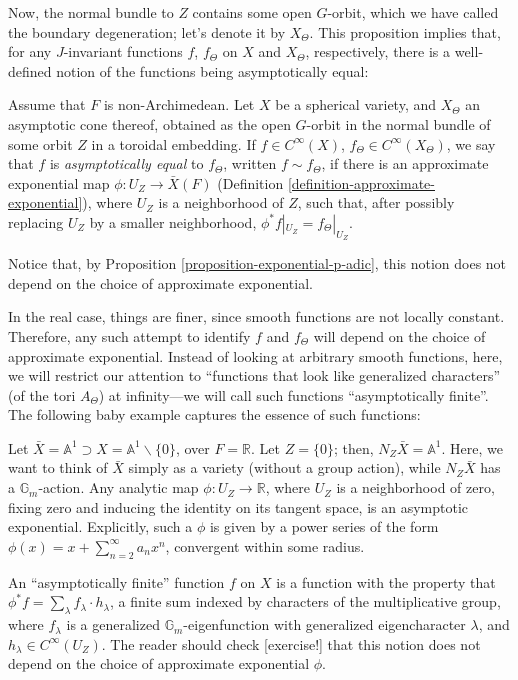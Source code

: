 Now, the normal bundle to $Z$ contains some open $G$-orbit, which we have called the boundary degeneration; let's denote it by $X_\Theta$. This proposition implies that, for any $J$-invariant functions $f$, $f_\Theta$ on $X$ and $X_\Theta$, respectively, there is a well-defined notion of the functions being asymptotically equal:

\begin{definition}
 \label{definition-asymptotically-equal-padic}
Assume that $F$ is non-Archimedean. Let $X$ be a spherical variety, and $X_\Theta$ an asymptotic cone thereof, obtained as the open $G$-orbit in the normal bundle of some orbit $Z$ in a toroidal embedding. If $f\in C^\infty(X)$, $f_\Theta\in C^\infty(X_\Theta)$, we say that $f$ is {\it asymptotically equal} to $f_\Theta$, written $f\sim f_\Theta$, if there is an approximate exponential map $\phi: U_Z\to \bar X(F)$ (Definition \ref{definition-approximate-exponential}), where $U_Z$ is a neighborhood of $Z$, such that, after possibly replacing $U_Z$ by a smaller neighborhood, $\phi^* f|_{U_Z} = f_\Theta|_{U_Z}$.
\end{definition}

Notice that, by Proposition \ref{proposition-exponential-p-adic}, this notion does not depend on the choice of approximate exponential.

In the real case, things are finer, since smooth functions are not locally constant. Therefore, any such attempt to identify $f$ and $f_\Theta$ will depend on the choice of approximate exponential. Instead of looking at arbitrary smooth functions, here, we will restrict our attention to ``functions that look like generalized characters'' (of the tori $A_\Theta$) at infinity---we will call such functions ``asymptotically finite''. The following baby example captures the essence of such functions:

\begin{example}
 \label{example-real-asymptotics-baby}
Let $\bar X = \mathbb A^1 \supset X=\mathbb A^1\smallsetminus\{0\}$, over $F=\mathbb R$. Let $Z=\{0\}$; then, $N_Z \bar X = \mathbb A^1$. Here, we want to think of $\bar X$ simply as a variety (without a group action), while $N_Z \bar X$ has a $\mathbb G_m$-action. Any analytic map $\phi: U_Z\to \mathbb R$, where $U_Z$ is a neighborhood of zero, fixing zero and inducing the identity on its tangent space, is an asymptotic exponential. Explicitly, such a $\phi$ is given by a power series of the form $\phi(x) = x + \sum_{n=2}^\infty a_n x^n$, convergent within some radius. 

An ``asymptotically finite'' function $f$ on $X$ is a function with the property that $\phi^* f = \sum_\lambda f_\lambda \cdot h_\lambda$, a finite sum indexed by characters of the multiplicative group, where $f_\lambda$ is a generalized $\mathbb G_m$-eigenfunction with generalized eigencharacter $\lambda$, and $h_\lambda \in C^\infty(U_Z)$. The reader should check [exercise!] that this notion does not depend on the choice of approximate exponential $\phi$.
\end{example}

